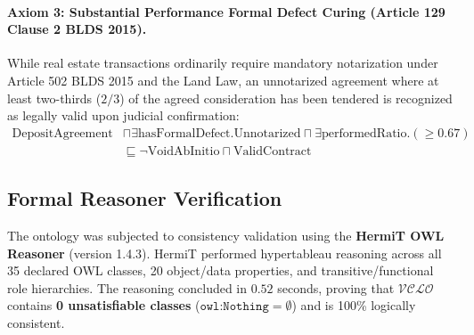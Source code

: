 \documentclass[11pt,a4paper]{article}
\begin{document}
\paragraph{Axiom 3: Substantial Performance Formal Defect Curing (Article 129 Clause 2 BLDS 2015).}
While real estate transactions ordinarily require mandatory notarization under Article 502 BLDS 2015 and the Land Law, an unnotarized agreement where at least two-thirds ($2/3$) of the agreed consideration has been tendered is recognized as legally valid upon judicial confirmation:
\begin{equation}
\label{eq:axiom5}
\begin{split}
\text{DepositAgreement} &\sqcap \exists \text{hasFormalDefect}.\text{Unnotarized} \sqcap \exists \text{performedRatio}.(\ge 0.67) \\
&\sqsubseteq \neg \text{VoidAbInitio} \sqcap \text{ValidContract}
\end{split}
\end{equation}

\subsection{Formal Reasoner Verification}
The ontology was subjected to consistency validation using the \textbf{HermiT OWL Reasoner} (version 1.4.3). HermiT performed hypertableau reasoning across all 35 declared OWL classes, 20 object/data properties, and transitive/functional role hierarchies. The reasoning concluded in $0.52$ seconds, proving that $\mathcal{VCLO}$ contains \textbf{0 unsatisfiable classes} ($\texttt{owl:Nothing} = \emptyset$) and is 100\% logically consistent.
\end{document}
